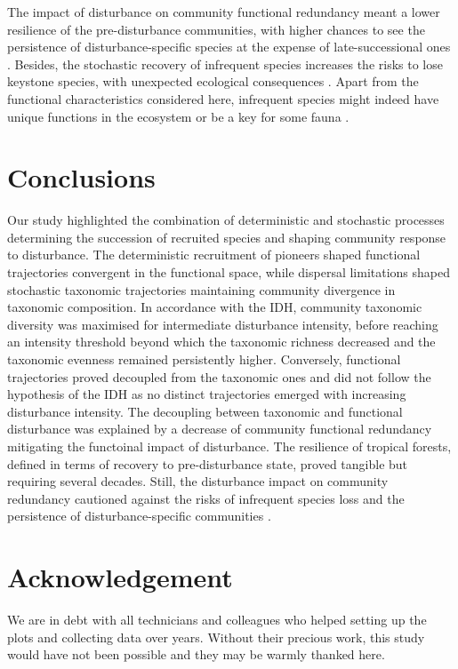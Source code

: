 \documentclass[fleqn,10pt]{ArtEcoFoG} %
\begin{document}
The impact of disturbance on community functional redundancy meant a
lower resilience of the pre-disturbance communities, with higher chances
to see the persistence of disturbance-specific species at the expense of
late-successional ones \citep{Haddad2008}. Besides, the stochastic
recovery of infrequent species increases the risks to lose keystone
species, with unexpected ecological consequences
\citep{Jones1994, Chazdon2003a, Diaz2005}. Apart from the functional
characteristics considered here, infrequent species might indeed have
unique functions in the ecosystem or be a key for some fauna
\citep{Schleuning2016}.

\section{Conclusions}\label{conclusions}

Our study highlighted the combination of deterministic and stochastic
processes determining the succession of recruited species and shaping
community response to disturbance. The deterministic recruitment of
pioneers shaped functional trajectories convergent in the functional
space, while dispersal limitations shaped stochastic taxonomic
trajectories maintaining community divergence in taxonomic composition.
In accordance with the IDH, community taxonomic diversity was maximised
for intermediate disturbance intensity, before reaching an intensity
threshold beyond which the taxonomic richness decreased and the
taxonomic evenness remained persistently higher. Conversely, functional
trajectories proved decoupled from the taxonomic ones and did not follow
the hypothesis of the IDH as no distinct trajectories emerged with
increasing disturbance intensity. The decoupling between taxonomic and
functional disturbance was explained by a decrease of community
functional redundancy mitigating the functoinal impact of disturbance.
The resilience of tropical forests, defined in terms of recovery to
pre-disturbance state, proved tangible but requiring several decades.
Still, the disturbance impact on community redundancy cautioned against
the risks of infrequent species loss and the persistence of
disturbance-specific communities \citep{Herault2018}.

\section{Acknowledgement}\label{acknowledgement}

We are in debt with all technicians and colleagues who helped setting up
the plots and collecting data over years. Without their precious work,
this study would have not been possible and they may be warmly thanked
here.
\end{document}
